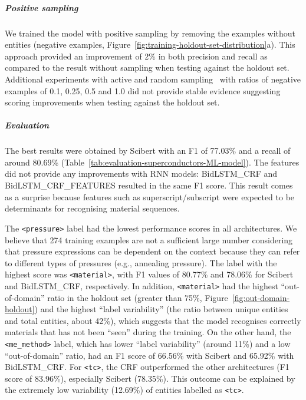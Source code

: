 \documentclass[]{interact}
\theoremstyle{plain}%
\theoremstyle{definition}
\theoremstyle{remark}
\begin{document}
\subparagraph*{Positive sampling}
We trained the model with positive sampling by removing the examples without entities (negative examples, Figure~\ref{fig:training-holdout-set-distribution}a).
This approach provided an improvement of 2\% in both precision and recall as compared to the result without sampling when testing against the holdout set.
Additional experiments with active and random sampling~\cite{lopez2021mining} with ratios of negative examples of 0.1, 0.25, 0.5 and 1.0 did not provide stable evidence suggesting scoring improvements when testing against the holdout set. 

\subparagraph*{Evaluation}

The best results were obtained by Scibert with an F1 of 77.03\% and a recall of around 80.69\% (Table~\ref{tab:evaluation-superconductors-ML-model}).
The features did not provide any improvements with RNN models: BidLSTM\_CRF and BidLSTM\_CRF\_FEATURES resulted in the same F1 score.
This result comes as a surprise because features such as superscript/subscript were expected to be determinants for recognising material sequences.

The \texttt{<pressure>} label had the lowest performance scores in all architectures. We believe that 274 training examples are not a sufficient large number considering that pressure expressions can be dependent on the context because they can refer to different types of pressures (e.g., annealing pressure).
The label with the highest score was \texttt{<material>}, with F1 values of 80.77\% and 78.06\% for Scibert and BidLSTM\_CRF, respectively. In addition, \texttt{<material>} had the highest ``out-of-domain'' ratio in the holdout set (greater than 75\%, Figure~\ref{fig:out-domain-holdout}) and the highest ``label variability'' (the ratio between unique entities and total entities, about 42\%), which suggests that the model recognises correctly materials that has not been ``seen'' during the training.
On the other hand, the \texttt{<me\_method>} label, which has lower ``label variability'' (around 11\%) and a low ``out-of-domain'' ratio, had an F1 score of 66.56\% with Scibert and 65.92\% with BidLSTM\_CRF.
For \texttt{<tc>}, the CRF outperformed the other architectures (F1 score of 83.96\%), especially Scibert (78.35\%). 
This outcome can be explained by the extremely low variability (12.69\%) of entities labelled as \texttt{<tc>}. %
\end{document}
